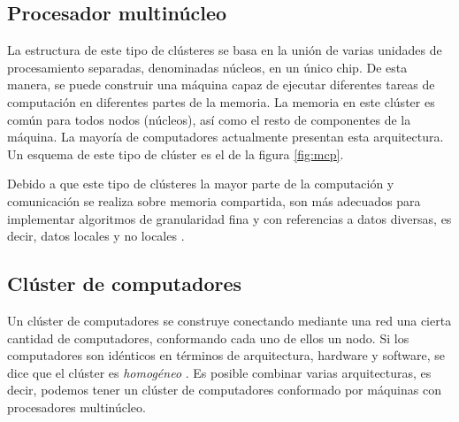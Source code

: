 \subsection{Procesador multinúcleo}

La estructura de este tipo de clústeres se basa en la unión de varias unidades de procesamiento separadas, denominadas
núcleos, en un único chip. De esta manera, se puede construir una máquina capaz de ejecutar diferentes tareas de
computación en diferentes partes de la memoria. La memoria en este clúster es común para todos nodos (núcleos), así 
como el resto de componentes de la máquina. La mayoría de computadores actualmente presentan esta arquitectura. Un 
esquema de este tipo de clúster es el de la figura \ref{fig:mcp}.

\vspace{10pt}
Debido a que este tipo de clústeres la mayor parte de la computación y comunicación se realiza sobre memoria 
compartida, son más adecuados para implementar algoritmos de granularidad fina y con referencias a datos diversas, es
decir, datos locales y no locales \cite{czech_2017}.

\subsection{Clúster de computadores}

Un clúster de computadores se construye conectando mediante una red una cierta cantidad de computadores, conformando
cada uno de ellos un nodo. Si los computadores son idénticos en términos de arquitectura, hardware y software, se dice
que el clúster es \textit{homogéneo} \cite{czech_2017}. Es posible combinar varias arquitecturas, es decir, podemos
tener un clúster de computadores conformado por máquinas con procesadores multinúcleo.

